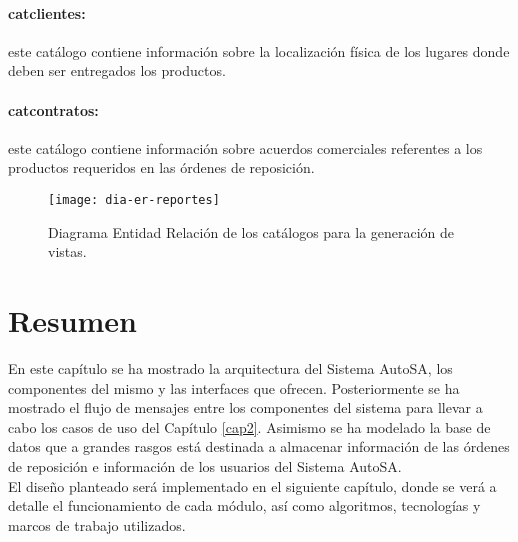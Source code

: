 \paragraph{cat{\textunderscore}clientes:} este catálogo contiene información sobre la localización física de los lugares donde deben ser entregados los productos.
\paragraph{cat{\textunderscore}contratos:} este catálogo contiene información sobre acuerdos comerciales referentes a los productos requeridos en las órdenes de reposición.
\begin{figure}[h]
  \centering
  \texttt{[image: dia-er-reportes]} 
  \caption{Diagrama Entidad Relación de los catálogos para la generación de vistas.}
  \label{fig:dia-er-reportes}
\end{figure}
\section{Resumen}
En este capítulo se ha mostrado la arquitectura del Sistema AutoSA, los componentes del mismo y las interfaces que ofrecen. Posteriormente se ha mostrado el flujo de mensajes entre los componentes del sistema para llevar a cabo los casos de uso del Capítulo \ref{cap2}. Asimismo se ha modelado la base de datos que a grandes rasgos está destinada a almacenar información de las órdenes de reposición e información de los usuarios del Sistema AutoSA.\\
El diseño planteado será implementado en el siguiente capítulo, donde se verá a detalle el funcionamiento de cada módulo, así como algoritmos, tecnologías y marcos de trabajo utilizados. 